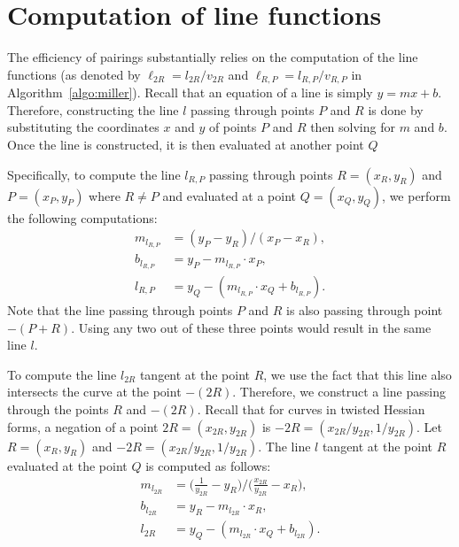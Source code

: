 \section{Computation of line functions}
\label{sec:lines}

The efficiency of pairings substantially relies on the computation of the line functions
(as denoted by $\ell_{2R} = l_{2R}/v_{2R}$ and $\ell_{R,P} = l_{R,P}/v_{R,P}$ in Algorithm~\ref{algo:miller}).
Recall that an equation of a line is simply $y = mx + b$.
Therefore, constructing the line $l$ passing through points $P$ and $R$
is done by substituting the coordinates $x$ and $y$ of points $P$ and $R$
then solving for $m$ and $b$.
Once the line is constructed, it is then evaluated at another point $Q$

Specifically, to compute the line $l_{R,P}$ passing through
points $R = (x_R, y_R)$ and $P = (x_P, y_P)$ where $R \ne P$
and evaluated at a point $Q = (x_Q, y_Q)$,
we perform the following computations:
\begin{align*}
m_{l_{R,P}} &= (y_P - y_R)/(x_P - x_R),			\\
b_{l_{R,P}} &= y_P - m_{l_{R,P}} \cdot x_P,		\\
l_{R,P} &= y_Q - (m_{l_{R,P}} \cdot x_Q + b_{l_{R,P}}). 
\end{align*}
Note that %
the line passing through points $P$ and $R$ is also passing through point $-(P+R)$.
Using any two out of these three points would result in the same line $l$.

To compute the line $l_{2R}$ tangent at the point $R$,
we use the fact that this line also intersects the curve at the point $-(2R)$.
Therefore, we construct a line passing through the points $R$ and $-(2R)$.
Recall that for curves in twisted Hessian forms,
a negation of a point $2R = (x_{2R}, y_{2R})$ is $-2R = (x_{2R}/y_{2R}, 1/y_{2R})$.
Let $R = (x_{R}, y_{R})$
and $-2R = (x_{2R}/y_{2R}, 1/y_{2R})$. %
The line $l$ tangent at the point $R$ evaluated at the point $Q$ is computed as follows:
\begin{align*}
m_{l_{2R}} &= \bigg( \frac{1}{y_{2R}} - y_{R} \bigg) / \bigg( \frac{x_{2R}}{y_{2R}} - x_{R} \bigg),	\\
b_{l_{2R}} &= y_R - m_{l_{2R}} \cdot x_R,		\\
l_{2R} &= y_Q - (m_{l_{2R}} \cdot x_Q + b_{l_{2R}}).
\end{align*}

